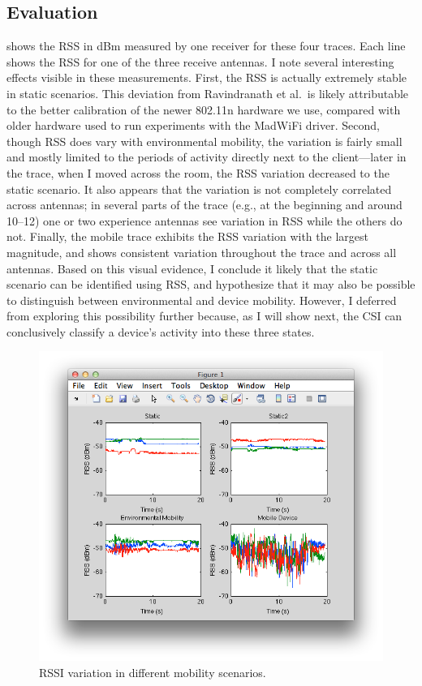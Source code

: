 \subsection{Evaluation}
  shows the RSS in dBm measured by one receiver for these four traces. Each line shows the RSS for one of the three receive antennas. I note several interesting effects visible in these measurements. First, the RSS is actually extremely stable in static scenarios. This deviation from Ravindranath et al.\ is likely attributable to the better calibration of the newer 802.11n hardware we use, compared with older hardware used to run experiments with the MadWiFi driver. Second, though RSS does vary with environmental mobility, the variation is fairly small and mostly limited to the periods of activity directly next to the client---later in the trace, when I moved across the room, the RSS variation decreased to the static scenario. It also appears that the variation is not completely correlated across antennas; in several parts of the trace (e.g., at the beginning and around 10--12\s) one or two experience antennas see variation in RSS while the others do not. Finally, the mobile trace exhibits the RSS variation with the largest magnitude, and shows consistent variation throughout the trace and across all antennas. Based on this visual evidence, I conclude it likely that the static scenario can be identified using RSS, and hypothesize that it may also be possible to distinguish between environmental and device mobility. However, I deferred from exploring this possibility further because, as I will show next, the CSI can conclusively classify a device's activity into these three states.

\begin{figure}[htp]
	\centering
	\includegraphics[width=\textwidth]{figures/esnr/mobility_rssi.png}
	\caption{\label{fig:mobility_rssi}RSSI variation in different mobility scenarios.}
\end{figure}

